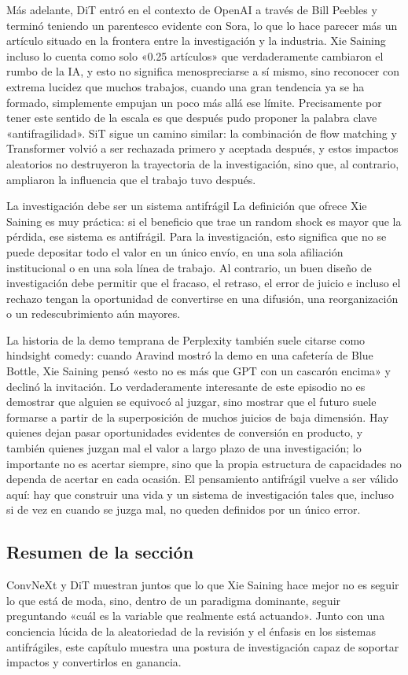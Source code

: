 Más adelante, DiT entró en el contexto de OpenAI a través de Bill Peebles y terminó teniendo un parentesco evidente con Sora, lo que lo hace parecer más un artículo situado en la frontera entre la investigación y la industria. Xie Saining incluso lo cuenta como solo «0.25 artículos» que verdaderamente cambiaron el rumbo de la IA, y esto no significa menospreciarse a sí mismo, sino reconocer con extrema lucidez que muchos trabajos, cuando una gran tendencia ya se ha formado, simplemente empujan un poco más allá ese límite. Precisamente por tener este sentido de la escala es que después pudo proponer la palabra clave «antifragilidad». SiT sigue un camino similar: la combinación de flow matching y Transformer volvió a ser rechazada primero y aceptada después, y estos impactos aleatorios no destruyeron la trayectoria de la investigación, sino que, al contrario, ampliaron la influencia que el trabajo tuvo después.

\begin{importantbox}{La investigación debe ser un sistema antifrágil}
La definición que ofrece Xie Saining es muy práctica: si el beneficio que trae un random shock es mayor que la pérdida, ese sistema es antifrágil. Para la investigación, esto significa que no se puede depositar todo el valor en un único envío, en una sola afiliación institucional o en una sola línea de trabajo. Al contrario, un buen diseño de investigación debe permitir que el fracaso, el retraso, el error de juicio e incluso el rechazo tengan la oportunidad de convertirse en una difusión, una reorganización o un redescubrimiento aún mayores.
\end{importantbox}

La historia de la demo temprana de Perplexity también suele citarse como hindsight comedy: cuando Aravind mostró la demo en una cafetería de Blue Bottle, Xie Saining pensó «esto no es más que GPT con un cascarón encima» y declinó la invitación. Lo verdaderamente interesante de este episodio no es demostrar que alguien se equivocó al juzgar, sino mostrar que el futuro suele formarse a partir de la superposición de muchos juicios de baja dimensión. Hay quienes dejan pasar oportunidades evidentes de conversión en producto, y también quienes juzgan mal el valor a largo plazo de una investigación; lo importante no es acertar siempre, sino que la propia estructura de capacidades no dependa de acertar en cada ocasión. El pensamiento antifrágil vuelve a ser válido aquí: hay que construir una vida y un sistema de investigación tales que, incluso si de vez en cuando se juzga mal, no queden definidos por un único error.

\subsection{Resumen de la sección}

ConvNeXt y DiT muestran juntos que lo que Xie Saining hace mejor no es seguir lo que está de moda, sino, dentro de un paradigma dominante, seguir preguntando «cuál es la variable que realmente está actuando». Junto con una conciencia lúcida de la aleatoriedad de la revisión y el énfasis en los sistemas antifrágiles, este capítulo muestra una postura de investigación capaz de soportar impactos y convertirlos en ganancia.
